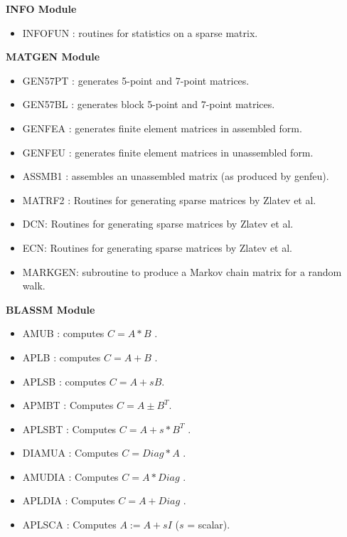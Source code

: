 \vskip 0.3in
\centerline{\bf INFO Module}

\begin{itemize} 
\item INFOFUN :  routines for statistics on a sparse matrix.
\end{itemize}

\vskip 0.3in
\centerline{\bf MATGEN Module}

\begin{itemize} 

\item GEN57PT : generates 5-point and 7-point matrices.                   
\item GEN57BL  : generates block 5-point and 7-point matrices.             
\item GENFEA   : generates finite element matrices in assembled form.
\item GENFEU   : generates finite element matrices in unassembled form.     
\item ASSMB1   : assembles an unassembled matrix (as produced by genfeu).
\item MATRF2 :  Routines for generating sparse matrices by Zlatev et al.
\item  DCN:  Routines for generating sparse matrices by Zlatev et al.
\item  ECN:  Routines for generating sparse matrices by Zlatev et al.
\item MARKGEN: subroutine to produce a Markov chain matrix for 	
	a random walk.
\end{itemize}

\vskip 0.3in
\centerline{\bf BLASSM Module} 
\begin{itemize} 
\item AMUB   :   computes     $ C = A*B $ .
\item APLB   :   computes     $ C = A+B $  .                                
\item APLSB  :   computes     $ C = A + s B $.   
\item APMBT  :   Computes     $ C = A \pm  B^T $.   
\item APLSBT :   Computes     $ C = A + s * B^T $  .                     
\item DIAMUA :   Computes     $ C = Diag * A $  .                      
\item AMUDIA :   Computes     $ C = A* Diag $ .  
\item APLDIA :   Computes     $ C = A + Diag $  .
\item APLSCA :   Computes     $ A:= A + s I  $ ($s$ = scalar).
\end{itemize}

